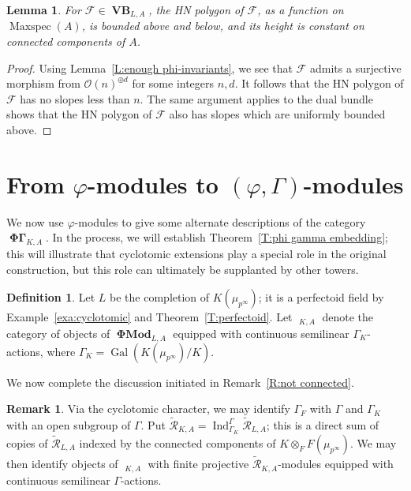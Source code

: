 \documentclass[12pt]{amsart}
\newtheorem{lemma}[theorem]{Lemma}
\theoremstyle{definition}
\newtheorem{defn}[theorem]{Definition}
\newtheorem{remark}[theorem]{Remark}
\numberwithin{equation}{theorem}
\newcommand{\calF}{\mathcal{F}}
\newcommand{\calO}{\mathcal{O}}
\newcommand{\calR}{\mathcal{R}}
\DeclareMathOperator{\Gal}{Gal}
\DeclareMathOperator{\Ind}{Ind}
\DeclareMathOperator{\Maxspec}{Maxspec}
\DeclareMathOperator{\PhiGamma}{\mathbf{\Phi \Gamma}}
\DeclareMathOperator{\PhiGammatilde}{\widetilde{\mathbf{\Phi \Gamma}}}
\DeclareMathOperator{\PhiMod}{\mathbf{\Phi Mod}}
\DeclareMathOperator{\VB}{\mathbf{VB}}
\begin{document}
\begin{lemma} \label{L:bounded slopes}
For $\calF \in \VB_{L,A}$, the HN polygon of $\calF$, as a function on $\Maxspec(A)$, is bounded above and below, and its height is constant on connected components of $A$.
\end{lemma}
\begin{proof}
Using Lemma~\ref{L:enough phi-invariants},
we see that $\calF$ admits a surjective morphism from $\calO(n)^{\oplus d}$ for some integers $n,d$. It follows that the HN polygon of $\calF$ has no slopes less than $n$.
The same argument applies to the dual bundle shows that the HN polygon of $\calF$ also has slopes which are uniformly bounded above.
\end{proof}
 

\section{From \texorpdfstring{$\varphi$}{phi}-modules to \texorpdfstring{$(\varphi, \Gamma)$}{(phi, Gamma)}-modules}
\label{sec:alternate}

We now use $\varphi$-modules to give some alternate descriptions of the category $\PhiGamma_{K,A}$. In the process, we will establish Theorem~\ref{T:phi gamma embedding}; this will illustrate that cyclotomic extensions play a special role in the original construction, but this role can ultimately be supplanted by other towers.

\begin{defn}
Let $L$ be the completion of $K(\mu_{p^\infty})$; it is a perfectoid field by
Example~\ref{exa:cyclotomic} and Theorem~\ref{T:perfectoid}.
Let $\PhiGammatilde_{K,A}$ denote the category of objects of $\PhiMod_{L,A}$ equipped with continuous semilinear $\Gamma_K$-actions, where $\Gamma_K = \Gal(K(\mu_{p^\infty})/K)$.
\end{defn}

We now complete the discussion initiated in Remark~\ref{R:not connected}.
\begin{remark} \label{R:not connected2}
Via the cyclotomic character, we may identify $\Gamma_F$ with $\Gamma$ and $\Gamma_K$ with an open subgroup of $\Gamma$. Put $\tilde{\calR}_{K,A} = \Ind_{\Gamma_K}^\Gamma \tilde{\calR}_{L,A}$; this is a direct sum of copies of $\tilde{\calR}_{L,A}$ indexed by the connected components of $K \otimes_F F(\mu_{p^\infty})$. 
We may then identify objects of $\PhiGammatilde_{K,A}$ with finite projective
$\tilde{\calR}_{K,A}$-modules equipped with continuous semilinear $\Gamma$-actions.
\end{remark}
\end{document}

